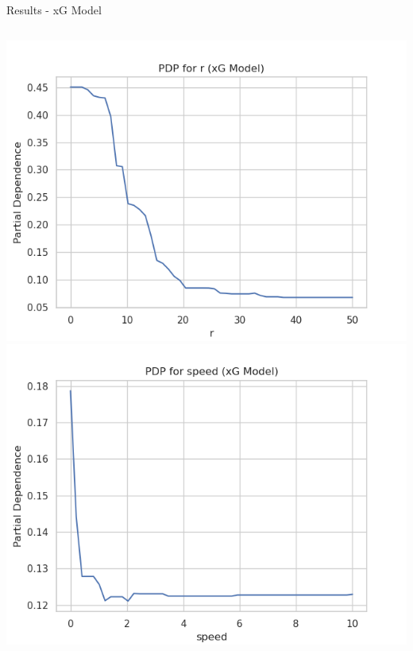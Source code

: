 \documentclass{beamer}
\begin{document}
\begin{frame}{Results - xG Model}
\begin{columns}[c]
  \includegraphics[width=\linewidth]{figures/xG_PDP_r.png}
  \includegraphics[width=\linewidth]{figures/xG_PDP_speed.png}


\end{columns}
\end{frame}
\end{document}
